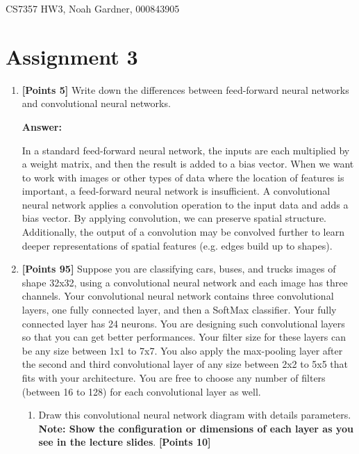 \documentclass[12pt]{article}
\begin{document}
CS7357 HW3, Noah Gardner, 000843905\newline

\section{Assignment 3}
\begin{enumerate}
      \item \textbf{[Points 5]} Write down the differences between feed-forward
            neural networks and convolutional neural networks.

            \textbf{Answer:}

            In a standard feed-forward neural network, the inputs are each
            multiplied by a weight matrix, and then the result is added to a
            bias vector. When we want to work with images or other types of data
            where the location of features is important, a feed-forward neural
            network is insufficient. A convolutional neural network applies a
            convolution operation to the input data and adds a bias vector. By
            applying convolution, we can preserve spatial structure.
            Additionally, the output of a convolution may be convolved further
            to learn deeper representations of spatial features (e.g. edges
            build up to shapes).

      \item \textbf{[Points 95]} Suppose you are classifying cars, buses, and
            trucks images of shape 32x32, using a convolutional neural network
            and each image has three channels. Your convolutional neural network
            contains three convolutional layers, one fully connected layer, and
            then a SoftMax classifier. Your fully connected layer has 24
            neurons. You are designing such convolutional layers so that you can
            get better performances. Your filter size for these layers can be
            any size between 1x1 to 7x7. You also apply the max-pooling layer
            after the second and third convolutional layer of any size between
            2x2 to 5x5 that fits with your architecture. You are free to choose
            any number of filters (between 16 to 128) for each convolutional
            layer as well.
            \begin{enumerate}
                  \item Draw this convolutional neural network diagram with
                        details parameters. \textbf{Note: Show the configuration
                              or dimensions of each layer as you see in the lecture
                              slides}. \textbf{[Points 10]}


\end{enumerate}
\end{enumerate}
\end{document}
